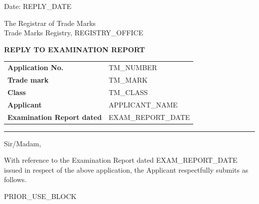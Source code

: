 \documentclass[12pt,a4paper]{article}
\begin{document}
\color{textPrimary}


\begin{flushright}
  {\small Date: {{REPLY_DATE}}}
\end{flushright}

\vspace{2mm}

\noindent
{\small
The Registrar of Trade Marks\\
Trade Marks Registry, {{REGISTRY_OFFICE}}\\
}

\vspace{4mm}

\begin{center}
  {\bfseries REPLY TO EXAMINATION REPORT}
\end{center}

\vspace{2mm}

\noindent
\begin{tabular}{@{}L{4.2cm}L{10.5cm}@{}}
  {\bfseries Application No.}  & {{TM_NUMBER}} \\[3pt]
  {\bfseries Trade mark}       & {{TM_MARK}} \\[3pt]
  {\bfseries Class}            & {{TM_CLASS}} \\[3pt]
  {\bfseries Applicant}        & {{APPLICANT_NAME}} \\[3pt]
  {\bfseries Examination Report dated} & {{EXAM_REPORT_DATE}} \\
\end{tabular}

\vspace{4mm}
{\color{borderGray}\rule{\textwidth}{0.4pt}}
\vspace{3mm}

\noindent Sir/Madam,

\vspace{2mm}

\noindent
With reference to the Examination Report dated {{EXAM_REPORT_DATE}} issued in
respect of the above application, the Applicant respectfully submits as follows.





{{PRIOR_USE_BLOCK}}
\end{document}
